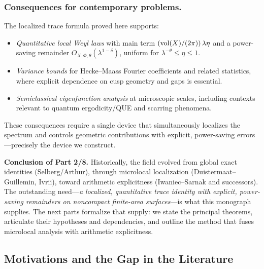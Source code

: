 \subsubsection*{Consequences for contemporary problems.}
The localized trace formula proved here supports:
\begin{itemize}
  \item \emph{Quantitative local Weyl laws} with main term
  $(\operatorname{vol}(X)/(2\pi))\,\lambda\eta$ and a power-saving remainder
  $O_{X,\Phi,\theta}(\lambda^{1-\delta})$, uniform for $\lambda^{-\theta}\le\eta\le1$.
  \item \emph{Variance bounds} for Hecke–Maass Fourier coefficients and related
  statistics, where explicit dependence on cusp geometry and gaps is essential.
  \item \emph{Semiclassical eigenfunction analysis} at microscopic scales, including
  contexts relevant to quantum ergodicity/QUE and scarring phenomena.
\end{itemize}
These consequences require a single device that simultaneously localizes the spectrum
and controls geometric contributions with explicit, power-saving errors—precisely the
device we construct.

\medskip

\noindent\textbf{Conclusion of Part 2/8.}
Historically, the field evolved from global exact identities (Selberg/Arthur), through
microlocal localization (Duistermaat–Guillemin, Ivrii), toward arithmetic explicitness
(Iwaniec–Sarnak and successors). The outstanding need—\emph{a localized, quantitative
trace identity with explicit, power-saving remainders on noncompact finite-area
surfaces}—is what this monograph supplies. The next parts formalize that supply:
we state the principal theorems, articulate their hypotheses and dependencies,
and outline the method that fuses microlocal analysis with arithmetic explicitness.


\subsection*{Motivations and the Gap in the Literature}

